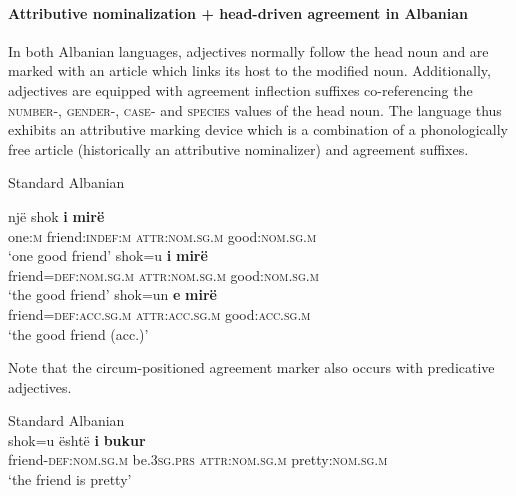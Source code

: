 \paragraph*{Attributive nominalization + head\hyp{}driven agreement in Albanian}
In both Albanian languages, adjectives normally follow the head noun and are marked with an article which links its host to the modified noun. Additionally, adjectives are equipped with agreement inflection suffixes co-referencing the \textsc{number}-, \textsc{gender}-, \textsc{case}- and \textsc{species} values of the head noun. The language thus exhibits an attributive marking device which is a combination of a phonologically free article (historically an attributive nominalizer) and agreement suffixes.
\begin{exe}
\ex \rm{Standard Albanian \citep[examples from][166–167]{himmelmann1997}}
\label{albanian ex}
\begin{xlist}
\ex
\gll	një	shok 	\textbf{i}	\textbf{mirë}\\
	one:\textsc{m}	friend:\textsc{indef:m} 	\textsc{attr:nom.sg.m}	good:\textsc{nom.sg.m}\\
\glt	‘one good friend’
\ex	
\gll	shok=u			\textbf{i}			\textbf{mirë}\\
	friend=\textsc{def:nom.sg.m} 	\textsc{attr:nom.sg.m} 	good:\textsc{nom.sg.m}\\
\glt	‘the good friend’
\ex
\gll	shok=un					\textbf{e}			\textbf{mirë}\\
	friend=\textsc{def:acc.sg.m} 	\textsc{attr:acc.sg.m} 	good:\textsc{acc.sg.m}\\
\glt	‘the good friend (acc.)’
\end{xlist}
\end{exe}
Note that the circum-positioned agreement marker also occurs with predicative adjectives. 
\begin{exe}
\ex \rm{Standard Albanian \citep{demiraj1998}}\\
\gll	shok=u është \textbf{i} \textbf{bukur}\\
	friend-\textsc{def:nom.sg.m} be\textsc{.3sg.prs} \textsc{attr:nom.sg.m} pretty:\textsc{nom.sg.m}\\
\glt	‘the friend is pretty’
\end{exe}
